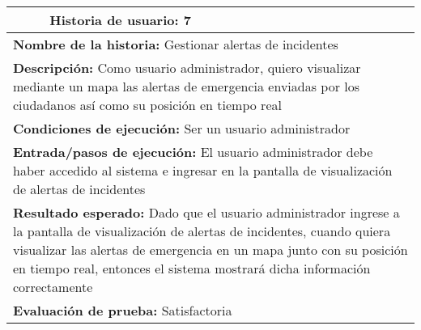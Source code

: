 \begin{longtable}{|p{6.7cm}|p{6.7cm}|}
    \hline
    \endlastfoot
    \multicolumn{1}{|p{6.7cm}|}{\textbf{Número} 7 } & \multicolumn{1}{|p{6.7cm}|}{\textbf{Historia de usuario:} 7}                                                                                                                                                                                                                 \\
    \hline
    \multicolumn{2}{|p{13.4cm}|}{\textbf{Nombre de la historia:} Gestionar alertas de incidentes }                                                                                                                                                                                                                                 \\
    \hline
    \multicolumn{2}{|p{13.4cm}|}{\textbf{Descripción:} Como usuario administrador, quiero visualizar mediante un mapa las alertas de emergencia enviadas por los ciudadanos así como su posición en tiempo real}                                                                                                                   \\
    \hline
    \multicolumn{2}{|p{13.4cm}|}{\textbf{Condiciones de ejecución:} Ser un usuario administrador}                                                                                                                                                                                                                                  \\
    \hline
    \multicolumn{2}{|p{13.4cm}|}{\textbf{Entrada/pasos de ejecución:} El usuario administrador debe haber accedido al sistema e ingresar en la pantalla de visualización de alertas de incidentes}                                                                                                                                 \\
    \hline
    \multicolumn{2}{|p{13.4cm}|}{\textbf{Resultado esperado:} Dado que el usuario administrador ingrese a la pantalla de visualización de alertas de incidentes, cuando quiera visualizar las alertas de emergencia en un mapa junto con su posición en tiempo real, entonces el sistema mostrará dicha información correctamente} \\
    \hline
    \multicolumn{2}{|p{13.4cm}|}{\textbf{Evaluación de prueba:} Satisfactoria}                                                                                                                                                                                                                                                     \\
    \hline
\end{longtable}


